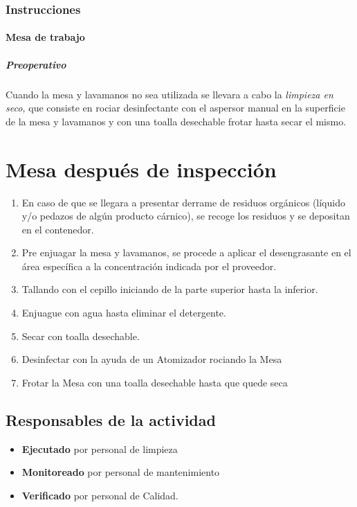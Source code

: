 \subsubsection{Instrucciones}
\paragraph{Mesa de trabajo}
\subparagraph{Preoperativo}
Cuando la mesa y lavamanos no sea utilizada se llevara a cabo la \emph{limpieza en seco,} que consiste en rociar desinfectante con el aspersor manual en la superficie de la mesa y lavamanos y con una toalla desechable frotar hasta secar el mismo.

\section{Mesa después de inspección}

\begin{enumerate}
	\item En caso de que se llegara a presentar derrame de residuos orgánicos (líquido y/o pedazos de algún producto cárnico), se recoge los residuos y se depositan en el contenedor.
	\item Pre enjuagar la mesa y lavamanos, se procede a aplicar el desengrasante en el área específica a la concentración indicada por el proveedor.
	\item Tallando con el cepillo iniciando de la parte superior hasta la inferior.
	\item Enjuague con agua hasta eliminar el detergente.
	\item Secar con toalla desechable.
	\item Desinfectar con la ayuda de un Atomizador rociando la Mesa
	\item Frotar la Mesa con una toalla desechable hasta que quede seca
\end{enumerate}

\subsection{Responsables de la actividad}

\begin{itemize}
	\item \textbf{Ejecutado} por personal de limpieza
	\item \textbf{Monitoreado} por personal de mantenimiento
	\item \textbf{Verificado} por personal de Calidad.
\end{itemize}

